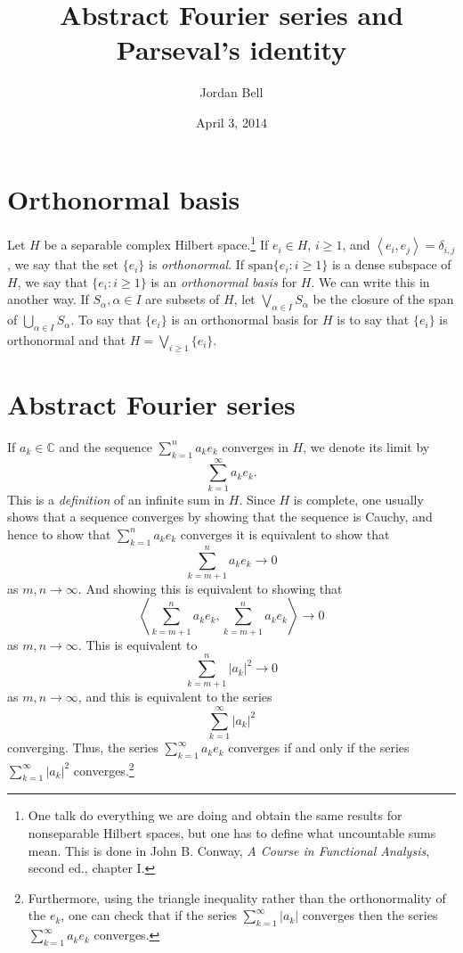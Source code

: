 \documentclass{article}
\newcommand{\inner}[2]{\left\langle #1, #2 \right\rangle}
\newcommand{\Span}{\textrm{span}}
\begin{document}
\title{Abstract Fourier series and Parseval's identity}
\author{Jordan Bell}
\date{April 3, 2014}
\maketitle

\section{Orthonormal basis}
Let $H$ be a separable complex Hilbert space.\footnote{One talk do everything we are doing and obtain the same results for nonseparable Hilbert spaces, but
one has to define what uncountable sums mean. This is done in John B. Conway, {\em A Course in Functional Analysis}, second ed., chapter I.}
 If $e_i \in H$, $i \geq 1$, and $\inner{e_i}{e_j}=\delta_{i,j}$, we say that the set $\{e_i\}$ is {\em orthonormal}. If
$\Span\{e_i: i \geq 1\}$ is a dense subspace of $H$, we say that $\{e_i: i \geq 1\}$ is an {\em orthonormal basis} for $H$. 
We can write this in another way. If $S_\alpha, \alpha \in I$ are subsets of $H$, let $\bigvee_{\alpha \in I} S_\alpha$ be the closure of the span of 
$\bigcup_{\alpha \in I} S_\alpha$. To say that $\{e_i\}$ is an orthonormal basis for $H$ is to say that $\{e_i\}$ is orthonormal and that
$H=\bigvee_{i \geq 1} \{e_i\}$.

\section{Abstract Fourier series}
If $a_k \in \mathbb{C}$ and the sequence
$\sum_{k=1}^n a_k e_k$ converges in $H$, we denote its limit by
\[
\sum_{k=1}^\infty a_k e_k.
\]
This is a {\em definition} of an infinite sum in $H$. Since $H$ is complete, one usually shows that a sequence converges by showing that the sequence is Cauchy, and hence
to show that $\sum_{k=1}^n a_k e_k$ converges it is equivalent to show that
\[
\sum_{k=m+1}^n a_k e_k \to 0
\]
as $m,n \to \infty$. And showing this is equivalent to showing that
\[
\inner{\sum_{k=m+1}^n a_k e_k}{\sum_{k=m+1}^n a_k e_k} \to 0
\] 
as $m, n \to \infty$. This is equivalent to
\[
\sum_{k=m+1}^n |a_k|^2 \to 0
\]
as $m,n \to \infty$, and this is equivalent to the series
\[
\sum_{k=1}^\infty |a_k|^2
\]
converging. Thus, the series $\sum_{k=1}^\infty a_k e_k$ converges if and only if the series $\sum_{k=1}^\infty |a_k|^2$ converges.\footnote{Furthermore, using the triangle
inequality rather than the orthonormality of the $e_k$, one can check that if
the series $\sum_{k=1}^\infty |a_k|$ converges then the series $\sum_{k=1}^\infty a_k e_k$ converges.}
\end{document}
